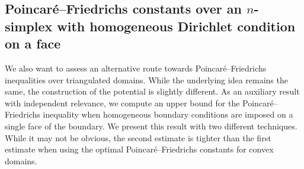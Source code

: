 \documentclass[10pt,letterpaper]{article}
\newcommand\cye[1]{%
  \protect\leavevmode
  \begingroup
    \color{red!35!yellow}%
    #1%
  \endgroup
}
\begin{document}
\subsection{\cye{Poincar\'e--Friedrichs constants over an $n$-simplex with homogeneous Dirichlet condition on a face}}

We also want to assess an alternative route towards Poincar\'e--Friedrichs inequalities over triangulated domains. 
While the underlying idea remains the same, the construction of the potential is slightly different. 
As an auxiliary result with independent relevance, we compute an upper bound for the Poincar\'e--Friedrichs inequality 
when homogeneous boundary conditions are imposed on a single face of the boundary. 
We present this result with two different techniques. 
While it may not be obvious, the second estimate is tighter than the first estimate when using the optimal Poincar\'e--Friedrichs constants for convex domains. 
\end{document}
